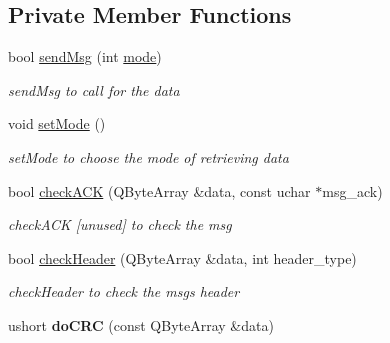 \subsection*{Private Member Functions}
\begin{DoxyCompactItemize}
\item 
bool \hyperlink{classlrf__controller_a29dcf87fb3936610c10872feb316e787}{send\+Msg} (int \hyperlink{classlrf__controller_a805afcd6b3ca2c2b44c4f21b96e33e4c}{mode})
\begin{DoxyCompactList}\small\item\em send\+Msg to call for the data \end{DoxyCompactList}\item 
\hypertarget{classlrf__controller_aa1221e1b1a79e2246315697ba9bfd85e}{}void \hyperlink{classlrf__controller_aa1221e1b1a79e2246315697ba9bfd85e}{set\+Mode} ()\label{classlrf__controller_aa1221e1b1a79e2246315697ba9bfd85e}

\begin{DoxyCompactList}\small\item\em set\+Mode to choose the mode of retrieving data \end{DoxyCompactList}\item 
bool \hyperlink{classlrf__controller_adc6a847d94992ebd902b757215990a89}{check\+A\+C\+K} (Q\+Byte\+Array \&data, const uchar $\ast$msg\+\_\+ack)
\begin{DoxyCompactList}\small\item\em check\+A\+C\+K \mbox{[}unused\mbox{]} to check the msg \end{DoxyCompactList}\item 
bool \hyperlink{classlrf__controller_acd409f6265a4744a6d462fb903f9ecc8}{check\+Header} (Q\+Byte\+Array \&data, int header\+\_\+type)
\begin{DoxyCompactList}\small\item\em check\+Header to check the msg\textquotesingle{}s header \end{DoxyCompactList}\item 
\hypertarget{classlrf__controller_a1fa9747007d6d262a1caa676c75f4022}{}ushort {\bfseries do\+C\+R\+C} (const Q\+Byte\+Array \&data)\label{classlrf__controller_a1fa9747007d6d262a1caa676c75f4022}

\end{DoxyCompactItemize}
